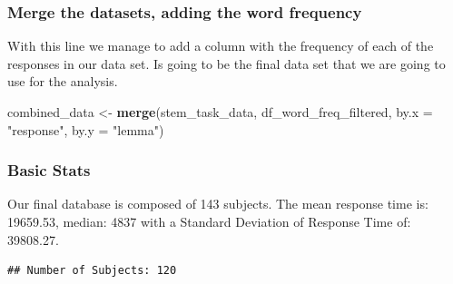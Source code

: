 \documentclass[
]{article}
\newenvironment{Shaded}{\begin{snugshade}}{\end{snugshade}}
\newcommand{\AttributeTok}[1]{\textcolor[rgb]{0.13,0.29,0.53}{#1}}
\newcommand{\CommentTok}[1]{\textcolor[rgb]{0.56,0.35,0.01}{\textit{#1}}}
\newcommand{\ConstantTok}[1]{\textcolor[rgb]{0.56,0.35,0.01}{#1}}
\newcommand{\FunctionTok}[1]{\textcolor[rgb]{0.13,0.29,0.53}{\textbf{#1}}}
\newcommand{\NormalTok}[1]{#1}
\newcommand{\OtherTok}[1]{\textcolor[rgb]{0.56,0.35,0.01}{#1}}
\newcommand{\SpecialCharTok}[1]{\textcolor[rgb]{0.81,0.36,0.00}{\textbf{#1}}}
\newcommand{\StringTok}[1]{\textcolor[rgb]{0.31,0.60,0.02}{#1}}
\begin{document}
\hypertarget{merge-the-datasets-adding-the-word-frequency}{%
\subsubsection{Merge the datasets, adding the word
frequency}\label{merge-the-datasets-adding-the-word-frequency}}

With this line we manage to add a column with the frequency of each of
the responses in our data set. Is going to be the final data set that we
are going to use for the analysis.

\begin{Shaded}
\begin{Highlighting}[]
\NormalTok{combined\_data }\OtherTok{\textless{}{-}} \FunctionTok{merge}\NormalTok{(stem\_task\_data, df\_word\_freq\_filtered, }\AttributeTok{by.x =} \StringTok{"response"}\NormalTok{, }\AttributeTok{by.y =} \StringTok{"lemma"}\NormalTok{)}
\end{Highlighting}
\end{Shaded}

\hypertarget{basic-stats}{%
\subsubsection{Basic Stats}\label{basic-stats}}

Our final database is composed of 143 subjects. The mean response time
is: 19659.53, median: 4837 with a Standard Deviation of Response Time
of: 39808.27.

\begin{Shaded}
\end{Shaded}

\begin{verbatim}
## Number of Subjects: 120
\end{verbatim}

\begin{Shaded}
\end{Shaded}
\end{document}
